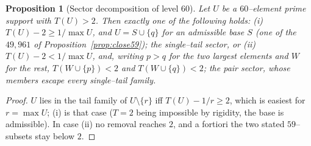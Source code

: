 \documentclass[11pt]{article}
\newtheorem{proposition}[theorem]{Proposition}
\theoremstyle{definition}
\begin{document}
\begin{proposition}[Sector decomposition of level $60$]\label{prop:sectors}
Let $U$ be a $60$--element prime support with $T(U)>2$. Then exactly one of the following holds:
\textup{(i)} $T(U)-2\ge 1/\max U$, and $U=S\cup\{q\}$ for an admissible base $S$
\textup{(}one of the $49{,}961$ of Proposition~\ref{prop:close59}\textup{)}; the
\emph{single--tail sector}, or \textup{(ii)} $T(U)-2<1/\max U$, and, writing $p>q$ for the two
largest elements and $W$ for the rest, $T(W\cup\{p\})<2$ and $T(W\cup\{q\})<2$; the
\emph{pair sector}, whose members escape every single--tail family.
\end{proposition}
\begin{proof}
$U$ lies in the tail family of $U\setminus\{r\}$ iff $T(U)-1/r\ge2$, which is easiest for
$r=\max U$; (i) is that case ($T=2$ being impossible by rigidity, the base is admissible). In
case (ii) no removal reaches $2$, and a fortiori the two stated $59$--subsets stay below $2$.
\end{proof}
\end{document}

